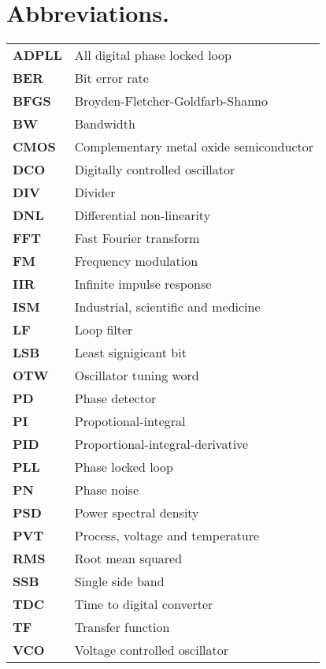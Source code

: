 \pagebreak
\null
\pagebreak
\section*{Abbreviations.}
	\begin{tabular}{@{}ll}
		\textbf{\textsf{ADPLL}}	&	All digital phase locked loop \\
		\textbf{\textsf{BER}}	&	Bit error rate \\
		\textbf{\textsf{BFGS}}	&	Broyden-Fletcher-Goldfarb-Shanno \\
		\textbf{\textsf{BW}}	&	Bandwidth \\
		\textbf{\textsf{CMOS}}	&	Complementary metal oxide semiconductor \\
		\textbf{\textsf{DCO}}	&	Digitally controlled oscillator \\
		\textbf{\textsf{DIV}}	&	Divider \\
		\textbf{\textsf{DNL}}	&	Differential non-linearity \\
		\textbf{\textsf{FFT}}	&	Fast Fourier transform \\
		\textbf{\textsf{FM}}	&	Frequency modulation \\
		\textbf{\textsf{IIR}}	&	Infinite impulse response \\
		\textbf{\textsf{ISM}}	&	Industrial, scientific and medicine \\
		\textbf{\textsf{LF}}	&	Loop filter \\
		\textbf{\textsf{LSB}}	&	Least signigicant bit \\
		\textbf{\textsf{OTW}}	&	Oscillator tuning word \\
		\textbf{\textsf{PD}}	&	Phase detector \\
		\textbf{\textsf{PI}}	&	Propotional-integral \\
		\textbf{\textsf{PID}}	&	Proportional-integral-derivative \\
		\textbf{\textsf{PLL}}	&	Phase locked loop \\
		\textbf{\textsf{PN}}	&	Phase noise \\
		\textbf{\textsf{PSD}}	&	Power spectral density \\
		\textbf{\textsf{PVT}}	&	Process, voltage and temperature \\
		\textbf{\textsf{RMS}}	&	Root mean squared \\
		\textbf{\textsf{SSB}}	&	Single side band \\
		\textbf{\textsf{TDC}}	&	Time to digital converter \\
		\textbf{\textsf{TF}}	&	Transfer function \\
		\textbf{\textsf{VCO}}	&	Voltage controlled oscillator \\
	\end{tabular}

